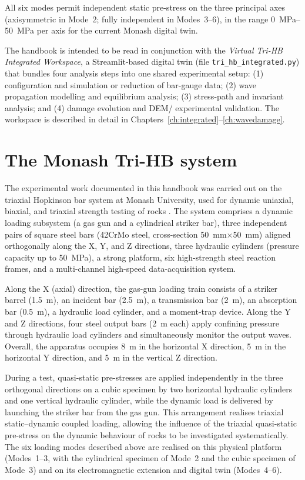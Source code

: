 \documentclass[11pt,a4paper,openany]{book}
\providecommand{\SI}[2]{\qty{#1}{#2}}
\providecommand{\SIrange}[3]{\qtyrange{#1}{#2}{#3}}
\theoremstyle{handbook}
\begin{document}
\noindent All six modes permit independent static pre-stress on the three
principal axes (axisymmetric in Mode~2; fully independent in Modes~3--6),
in the range \SIrange{0}{50}{MPa} per axis for the current Monash digital
twin.

The handbook is intended to be read in conjunction with the
\emph{Virtual Tri-HB Integrated Workspace}, a Streamlit-based digital twin
(file \texttt{tri\_hb\_integrated.py}) that bundles four analysis steps into
one shared experimental setup: (1) configuration and simulation or reduction
of bar-gauge data; (2) wave propagation modelling and equilibrium analysis;
(3) stress-path and invariant analysis; and (4) damage evolution and DEM/
experimental validation. The workspace is described in detail in
Chapters~\ref{ch:integrated}--\ref{ch:wavedamage}.

\section{The Monash Tri-HB system}\label{sec:monash-trihb}

The experimental work documented in this handbook was carried out on the
triaxial Hopkinson bar system at Monash University, used for dynamic
uniaxial, biaxial, and triaxial strength testing of rocks
\cite{Liu2019,Zhang2019Tri}. The system comprises a dynamic loading
subsystem (a gas gun and a cylindrical striker bar), three independent pairs
of square steel bars (42CrMo steel, cross-section
\SI{50}{mm}$\times$\SI{50}{mm}) aligned orthogonally along the X, Y, and Z
directions, three hydraulic cylinders (pressure capacity up to \SI{50}{MPa}),
a strong platform, six high-strength steel reaction frames, and a
multi-channel high-speed data-acquisition system.

Along the X (axial) direction, the gas-gun loading train consists of a
striker barrel (\SI{1.5}{m}), an incident bar (\SI{2.5}{m}), a transmission
bar (\SI{2}{m}), an absorption bar (\SI{0.5}{m}), a hydraulic load cylinder,
and a moment-trap device. Along the Y and Z directions, four steel output
bars (\SI{2}{m} each) apply confining pressure through hydraulic load
cylinders and simultaneously monitor the output waves. Overall, the
apparatus occupies \SI{8}{m} in the horizontal X direction, \SI{5}{m} in the
horizontal Y direction, and \SI{5}{m} in the vertical Z direction.

During a test, quasi-static pre-stresses are applied independently in the
three orthogonal directions on a cubic specimen by two horizontal hydraulic
cylinders and one vertical hydraulic cylinder, while the dynamic load is
delivered by launching the striker bar from the gas gun. This arrangement
realises triaxial static--dynamic coupled loading, allowing the influence of
the triaxial quasi-static pre-stress on the dynamic behaviour of rocks to be
investigated systematically. The six loading modes described above are
realised on this physical platform (Modes~1--3, with the cylindrical
specimen of Mode~2 and the cubic specimen of Mode~3) and on its
electromagnetic extension and digital twin (Modes~4--6).
\end{document}
